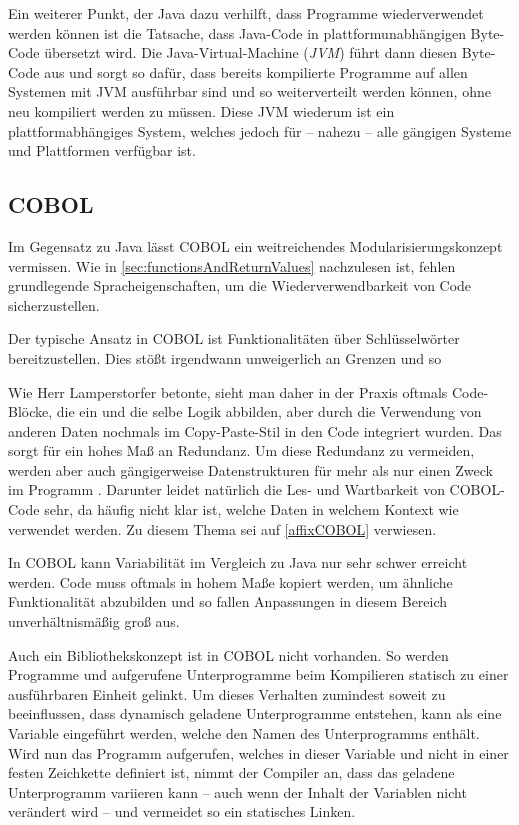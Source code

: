 Ein weiterer Punkt, der Java dazu verhilft, dass Programme wiederverwendet werden können ist die Tatsache, dass Java-Code in plattformunabhängigen Byte-Code übersetzt wird. Die Java-Virtual-Machine (\textit{JVM}) führt dann diesen Byte-Code aus und sorgt so dafür, dass bereits kompilierte Programme auf allen Systemen mit JVM ausführbar sind und so weiterverteilt werden können, ohne neu kompiliert werden zu müssen. Diese JVM wiederum ist ein plattformabhängiges System, welches jedoch für -- nahezu -- alle gängigen Systeme und Plattformen verfügbar ist.

\subsection*{COBOL}
Im Gegensatz zu Java lässt COBOL ein weitreichendes Modularisierungskonzept vermissen. Wie in \autoref{sec:functionsAndReturnValues} nachzulesen ist, fehlen grundlegende Spracheigenschaften, um die Wiederverwendbarkeit von Code sicherzustellen. 

Der typische Ansatz in COBOL ist Funktionalitäten über Schlüsselwörter bereitzustellen. Dies stößt irgendwann unweigerlich an Grenzen und so 


Wie Herr Lamperstorfer betonte, sieht man daher in der Praxis oftmals Code-Blöcke, die ein und die selbe Logik abbilden, aber durch die Verwendung von anderen Daten nochmals im Copy-Paste-Stil in den Code integriert wurden. Das sorgt für ein hohes Maß an Redundanz. Um diese Redundanz zu vermeiden, werden aber auch gängigerweise Datenstrukturen für mehr als nur einen Zweck im Programm . Darunter leidet natürlich die Les- und Wartbarkeit von COBOL-Code sehr, da häufig nicht klar ist, welche Daten in welchem Kontext wie verwendet werden. Zu diesem Thema sei auf \autoref{affixCOBOL} verwiesen.

In COBOL kann Variabilität im Vergleich zu Java nur sehr schwer erreicht werden. Code muss oftmals in hohem Maße kopiert werden, um ähnliche Funktionalität abzubilden und so fallen Anpassungen in diesem Bereich unverhältnismäßig groß aus.

Auch ein Bibliothekskonzept ist in COBOL nicht vorhanden. So werden Programme und aufgerufene Unterprogramme beim Kompilieren statisch zu einer ausführbaren Einheit gelinkt. Um dieses Verhalten zumindest soweit zu beeinflussen, dass dynamisch geladene Unterprogramme entstehen, kann als  eine Variable eingeführt werden, welche den Namen des Unterprogramms enthält. Wird nun das Programm aufgerufen, welches in dieser Variable und nicht in einer festen Zeichkette definiert ist, nimmt der Compiler an, dass das geladene Unterprogramm variieren kann -- auch wenn der Inhalt der Variablen nicht verändert wird -- und vermeidet so ein statisches Linken.

